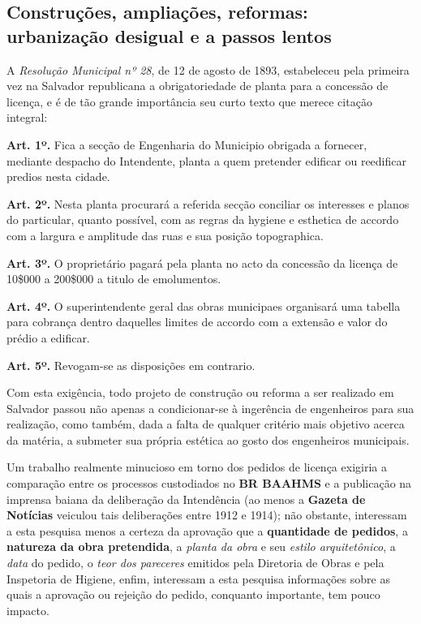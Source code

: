 \subsection{Construções, ampliações, reformas: urbanização desigual e a passos lentos}\label{subsec:constrampliref}

A \textit{Resolução Municipal nº 28}, de 12 de agosto de 1893, estabeleceu pela primeira vez na Salvador republicana a obrigatoriedade de planta para a concessão de licença, e é de tão grande importância seu curto texto que merece citação integral:

\begin{citacao}
\textbf{Art. 1º.} Fica a secção de Engenharia do Municipio obrigada a fornecer, mediante despacho do Intendente, planta a quem pretender edificar ou reedificar predios nesta cidade.

\textbf{Art. 2º.} Nesta planta procurará a referida secção conciliar os interesses e planos do particular, quanto possível, com as regras da hygiene e esthetica de accordo com a largura e amplitude das ruas e sua posição topographica.

\textbf{Art. 3º.} O proprietário pagará pela planta no acto da concessão da licença de 10\$000 a 200\$000 a titulo de emolumentos.

\textbf{Art. 4º.} O superintendente geral das obras municipaes organisará uma tabella para cobrança dentro daquelles limites de accordo com a extensão e valor do prédio a edificar.

\textbf{Art. 5º.} Revogam-se as disposições em contrario.
\end{citacao}

Com esta exigência, todo projeto de construção ou reforma a ser realizado em Salvador passou não apenas a condicionar-se à ingerência de engenheiros para sua realização, como também, dada a falta de qualquer critério mais objetivo acerca da matéria, a submeter sua própria estética ao gosto dos engenheiros municipais.

Um trabalho realmente minucioso em torno dos pedidos de licença exigiria a comparação entre os processos custodiados no \textbf{BR BAAHMS} e a publicação na imprensa baiana da deliberação da Intendência (ao menos a \textbf{Gazeta de Notícias} veiculou tais deliberações entre 1912 e 1914); não obstante, interessam a esta pesquisa menos a certeza da aprovação que a \textbf{quantidade de pedidos}, a \textbf{natureza da obra pretendida}, a \textit{planta da obra} e seu \textit{estilo arquitetônico}, a \textit{data} do pedido, o \textit{teor dos pareceres} emitidos pela Diretoria de Obras e pela Inspetoria de Higiene, enfim, interessam a esta pesquisa informações sobre as quais a aprovação ou rejeição do pedido, conquanto importante, tem pouco impacto.


